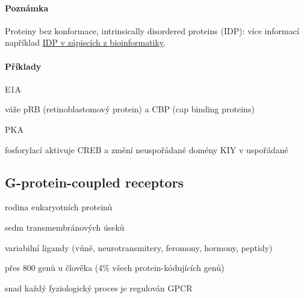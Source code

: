 \documentclass[DIV=8]{scrreprt}
\newcommand{\mybox}[2]{
    \paragraph{#1} #2
}
\begin{document}
\mybox{Poznámka}{Proteiny bez konformace, intrinsically disordered proteins (IDP): více informací například \href{https://eugleo.github.io/bioinformatika/doc/zaklady-bioinformatiky\#Intrinsically disordered proteins}{IDP v zápiscích z bioinformatiky}.

\paragraph{Příklady}
\begin{myItemize}[nosep]
    \item E1A
\begin{myItemize}[nosep]
    \item váže pRB (retinoblastomový protein) a CBP (cap binding proteins)
\end{myItemize}

    \item PKA
\begin{myItemize}[nosep]
    \item fosforylací aktivuje CREB a změní neuspořádané domény KIY v uspořádané
\end{myItemize}

\end{myItemize}

}


\subsection{G-protein-coupled receptors} \label{G-protein-coupled receptors}


\begin{myItemize}[nosep]
    \item rodina eukaryotních proteinů
    \item sedm transmembránových úseků
    \item variabilní ligandy (vůně, neurotransmitery, feromony, hormony, peptidy)
    \item přes 800 genů u člověka (4\% všech protein-kódujících genů)
    \item snad každý fyziologický proces je regulován GPCR
\end{myItemize}
\end{document}
